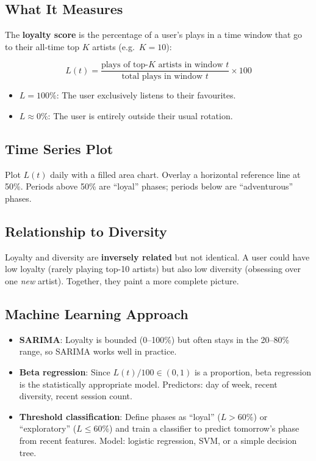 \documentclass[12pt, a4paper]{article}
\begin{document}
\subsection{What It Measures}

The \textbf{loyalty score} is the percentage of a user's plays in a time
window that go to their all-time top $K$ artists (e.g.\ $K = 10$):

\[
    L(t) = \frac{\text{plays of top-}K\text{ artists in window } t}
                {\text{total plays in window } t} \times 100
\]

\begin{itemize}
    \item $L = 100\%$: The user exclusively listens to their favourites.
    \item $L \approx 0\%$: The user is entirely outside their usual rotation.
\end{itemize}

\subsection{Time Series Plot}

Plot $L(t)$ daily with a filled area chart. Overlay a horizontal reference
line at 50\%. Periods above 50\% are ``loyal'' phases; periods below are
``adventurous'' phases.

\subsection{Relationship to Diversity}

Loyalty and diversity are \textbf{inversely related} but not identical.
A user could have low loyalty (rarely playing top-10 artists) but also low
diversity (obsessing over one \emph{new} artist). Together, they paint a
more complete picture.

\subsection{Machine Learning Approach}

\begin{itemize}
    \item \textbf{SARIMA}: Loyalty is bounded (0--100\%) but often stays
          in the 20--80\% range, so SARIMA works well in practice.
    \item \textbf{Beta regression}: Since $L(t)/100 \in (0,1)$ is a
          proportion, beta regression is the statistically appropriate
          model. Predictors: day of week, recent diversity, recent session
          count.
    \item \textbf{Threshold classification}: Define phases as ``loyal''
          ($L > 60\%$) or ``exploratory'' ($L \leq 60\%$) and train a
          classifier to predict tomorrow's phase from recent features.
          Model: logistic regression, SVM, or a simple decision tree.
\end{itemize}
\end{document}
